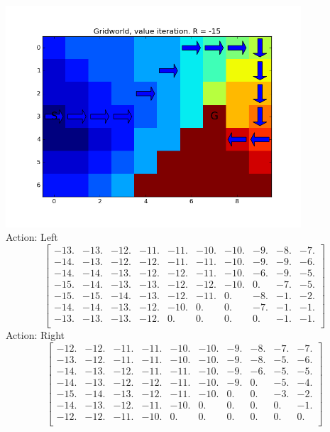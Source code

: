 \documentclass[11pt]{article}
\begin{document}
\includegraphics[width=11cm]{actionvaluepolicy.png}
\\
Action: Left
\[
\begin{bmatrix}
  -13. & -13. & -12. & -11. & -11. & -10. & -10. & -9. & -8. & -7.\\
  -14. & -13. & -12. & -12. & -11. & -11. & -10. & -9. & -9. & -6.\\
  -14. & -14. & -13. & -12. & -12. & -11. & -10. & -6. & -9. & -5.\\
  -15. & -14. & -13. & -13. & -12. & -12. & -10. & 0. & -7. & -5.\\
  -15. & -15. & -14. & -13. & -12. & -11. & 0. & -8. & -1. & -2.\\
  -14. & -14. & -13. & -12. & -10. & 0. & 0. & -7. & -1. & -1.\\
  -13. & -13. & -13. & -12. & 0. & 0. & 0. & 0. & -1. & -1.\\
\end{bmatrix} 
\]
Action: Right
\[
\begin{bmatrix}
  -12. & -12. & -11. & -11. & -10. & -10. & -9. & -8. & -7. & -7.\\
  -13. & -12. & -11. & -11. & -10. & -10. & -9. & -8. & -5. & -6.\\
  -14. & -13. & -12. & -11. & -11. & -10. & -9. & -6. & -5. & -5.\\
  -14. & -13. & -12. & -12. & -11. & -10. & -9. & 0. & -5. & -4.\\
  -15. & -14. & -13. & -12. & -11. & -10. & 0. & 0. & -3. & -2.\\
  -14. & -13. & -12. & -11. & -10. & 0. & 0. & 0. & 0. & -1.\\
  -12. & -12. & -11. & -10. & 0. & 0. & 0. & 0. & 0. & 0.\\
\end{bmatrix}
\]
\end{document}
